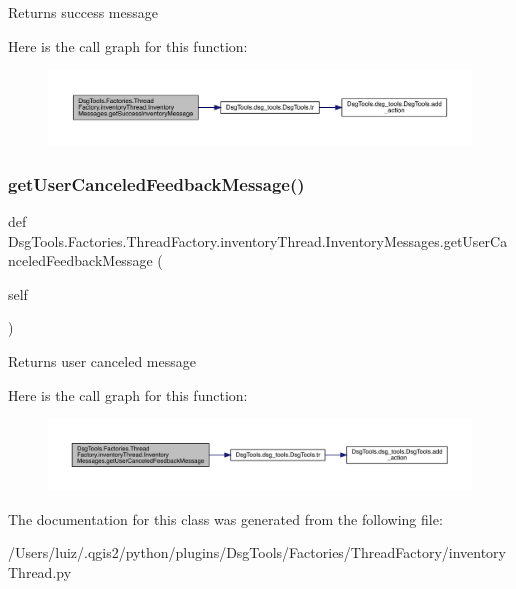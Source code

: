 \begin{DoxyVerb}Returns success message
\end{DoxyVerb}
 Here is the call graph for this function\+:
\nopagebreak
\begin{figure}[H]
\begin{center}
\leavevmode
\includegraphics[width=350pt]{class_dsg_tools_1_1_factories_1_1_thread_factory_1_1inventory_thread_1_1_inventory_messages_a76d7fc2f7f4d7b428021f7adb13c559d_cgraph}
\end{center}
\end{figure}
\mbox{\label{class_dsg_tools_1_1_factories_1_1_thread_factory_1_1inventory_thread_1_1_inventory_messages_af94e6280493762f3ba7ba9c55201d5ee}} 
\subsubsection{\texorpdfstring{get\+User\+Canceled\+Feedback\+Message()}{getUserCanceledFeedbackMessage()}}
{\footnotesize\ttfamily def Dsg\+Tools.\+Factories.\+Thread\+Factory.\+inventory\+Thread.\+Inventory\+Messages.\+get\+User\+Canceled\+Feedback\+Message (\begin{DoxyParamCaption}\item[{}]{self }\end{DoxyParamCaption})}

\begin{DoxyVerb}Returns user canceled message
\end{DoxyVerb}
 Here is the call graph for this function\+:
\nopagebreak
\begin{figure}[H]
\begin{center}
\leavevmode
\includegraphics[width=350pt]{class_dsg_tools_1_1_factories_1_1_thread_factory_1_1inventory_thread_1_1_inventory_messages_af94e6280493762f3ba7ba9c55201d5ee_cgraph}
\end{center}
\end{figure}


The documentation for this class was generated from the following file\+:\begin{DoxyCompactItemize}
\item 
/\+Users/luiz/.\+qgis2/python/plugins/\+Dsg\+Tools/\+Factories/\+Thread\+Factory/inventory\+Thread.\+py\end{DoxyCompactItemize}
